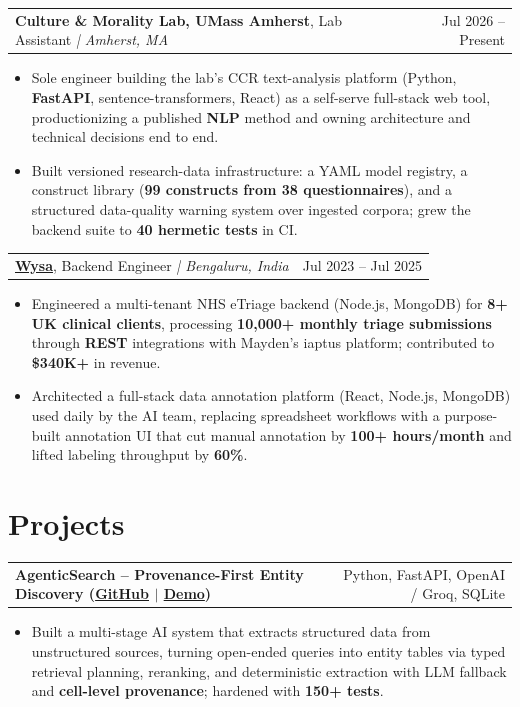 \documentclass[letterpaper,11pt]{article}
\makeatletter
\newcommand{\expItem}[4]{%
  \vspace{2pt}
  \begin{tabular*}{\textwidth}{@{}l@{\extracolsep{\fill}}r@{}}
    \textbf{#1}, #2 \textit{| #3} & #4 \\
  \end{tabular*}\par\vspace{-3pt}
}
\newcommand{\projItem}[2]{%
  \vspace{2pt}
  \begin{tabular*}{\textwidth}{@{}l@{\extracolsep{\fill}}r@{}}
    \textbf{#1} & #2 \\
  \end{tabular*}\par\vspace{-3pt}
}
\makeatother
\begin{document}
\expItem{Culture \& Morality Lab, UMass Amherst}{Lab Assistant}{Amherst, MA}{Jul 2026 -- Present}
\begin{itemize}
  \item Sole engineer building the lab's CCR text-analysis platform (Python, \textbf{FastAPI}, sentence-transformers, React) as a self-serve full-stack web tool, productionizing a published \textbf{NLP} method and owning architecture and technical decisions end to end.
  \item Built versioned research-data infrastructure: a YAML model registry, a construct library (\textbf{99 constructs from 38 questionnaires}), and a structured data-quality warning system over ingested corpora; grew the backend suite to \textbf{40 hermetic tests} in CI.
\end{itemize}

\expItem{\href{https://www.wysa.io}{Wysa}}{Backend Engineer}{Bengaluru, India}{Jul 2023 -- Jul 2025}
\begin{itemize}
  \item Engineered a multi-tenant NHS eTriage backend (Node.js, MongoDB) for \textbf{8+ UK clinical clients}, processing \textbf{10{,}000+ monthly triage submissions} through \textbf{REST} integrations with Mayden's iaptus platform; contributed to \textbf{\$340K+} in revenue.
  \item Architected a full-stack data annotation platform (React, Node.js, MongoDB) used daily by the AI team, replacing spreadsheet workflows with a purpose-built annotation UI that cut manual annotation by \textbf{100+ hours/month} and lifted labeling throughput by \textbf{60\%}.
\end{itemize}

\section{Projects}

\projItem{AgenticSearch -- Provenance-First Entity Discovery {\normalfont\small(\href{https://github.com/Deva-1903/ciir_agentic_search}{GitHub} $\vert$ \href{https://agentic-search-negglszkwa-uc.a.run.app}{Demo})}}{Python, FastAPI, OpenAI / Groq, SQLite}
\begin{itemize}
  \item Built a multi-stage AI system that extracts structured data from unstructured sources, turning open-ended queries into entity tables via typed retrieval planning, reranking, and deterministic extraction with LLM fallback and \textbf{cell-level provenance}; hardened with \textbf{150+ tests}.
\end{itemize}
\end{document}
